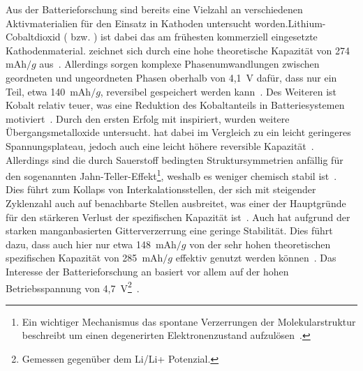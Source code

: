 Aus der Batterieforschung sind bereits eine Vielzahl an verschiedenen Aktivmaterialien für den Einsatz in Kathoden untersucht worden.Lithium-Cobaltdioxid ( bzw. ) ist dabei das am frühesten kommerziell eingesetzte Kathodenmaterial\cite{Amatucci1996}.  zeichnet sich durch eine hohe theoretische Kapazität von 274~$\si{\milli \ampere \hour \per g}$ aus~\cite{Ren2023}. Allerdings sorgen komplexe Phasenumwandlungen zwischen geordneten und ungeordneten Phasen oberhalb von 4,1~V dafür, dass nur ein Teil, etwa 140~$\si{\milli \ampere \hour \per g}$, reversibel gespeichert werden kann~\cite{Vetter2005, Liu2018}. Des Weiteren ist Kobalt relativ teuer, was eine Reduktion des Kobaltanteils in Batteriesystemen motiviert~\cite{Ren2023}.
Durch den ersten Erfolg mit  inspiriert, wurden weitere Übergangsmetalloxide untersucht.  hat dabei im Vergleich zu  ein leicht geringeres Spannungsplateau, jedoch auch eine leicht höhere reversible Kapazität~\cite{Ren2023}. Allerdings sind die durch Sauerstoff bedingten Struktursymmetrien anfällig für den sogenannten Jahn-Teller-Effekt\footnote{Ein wichtiger Mechanismus das spontane Verzerrungen der Molekularstruktur beschreibt um einen degenerirten Elektronenzustand aufzulösen~\cite{Jahn1937}.}, weshalb es weniger chemisch stabil ist~\cite{Kalyani2005}. Dies führt zum Kollaps von Interkalationsstellen, der sich mit steigender Zyklenzahl auch auf benachbarte Stellen ausbreitet, was einer der Hauptgründe für den stärkeren Verlust der spezifischen Kapazität ist~\cite{Vaelikangas2020}. Auch  hat aufgrund der starken manganbasierten Gitterverzerrung eine geringe Stabilität. Dies führt dazu, dass auch hier nur etwa 148~$\si{\milli \ampere \hour \per g}$ von der sehr hohen theoretischen spezifischen Kapazität von 285~$\si{\milli \ampere \hour \per g}$ effektiv genutzt werden können~\cite{Chen2014}. Das Interesse der Batterieforschung an  basiert vor allem auf der hohen Betriebsspannung von 4,7~V\footnote{Gemessen gegenüber dem Li/Li+ Potenzial.}~\cite{Liang2020,Yu2021,Liang2020a}.

